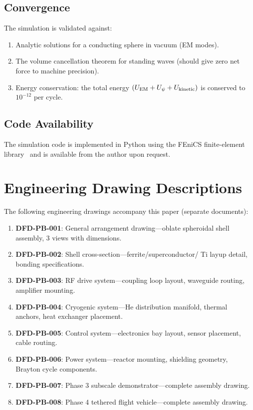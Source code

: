 \documentclass[twocolumn,prl,superscriptaddress,nofootinbib,longbibliography,floatfix]{revtex4-2}
\begin{document}
\subsection{Convergence}

The simulation is validated against:
\begin{enumerate}[nosep]
\item Analytic solutions for a conducting sphere in vacuum (EM modes).
\item The volume cancellation theorem for standing waves (should give
zero net force to machine precision).
\item Energy conservation: the total energy
$(U_{\rm EM} + U_\psi + U_{\rm kinetic})$ is conserved to $10^{-12}$
per cycle.
\end{enumerate}

\subsection{Code Availability}

The simulation code is implemented in Python using the FEniCS
finite-element library~\cite{FEniCS2015} and is available from the
author upon request.

\section{Engineering Drawing Descriptions}\label{app:drawings}

The following engineering drawings accompany this paper (separate
documents):

\begin{enumerate}
\item \textbf{DFD-PB-001}: General arrangement drawing---oblate
spheroidal shell assembly, 3 views with dimensions.
\item \textbf{DFD-PB-002}: Shell cross-section---ferrite/superconductor/
Ti layup detail, bonding specifications.
\item \textbf{DFD-PB-003}: RF drive system---coupling loop layout,
waveguide routing, amplifier mounting.
\item \textbf{DFD-PB-004}: Cryogenic system---He distribution manifold,
thermal anchors, heat exchanger placement.
\item \textbf{DFD-PB-005}: Control system---electronics bay layout,
sensor placement, cable routing.
\item \textbf{DFD-PB-006}: Power system---reactor mounting, shielding
geometry, Brayton cycle components.
\item \textbf{DFD-PB-007}: Phase 3 subscale demonstrator---complete
assembly drawing.
\item \textbf{DFD-PB-008}: Phase 4 tethered flight vehicle---complete
assembly drawing.
\end{enumerate}
\end{document}
